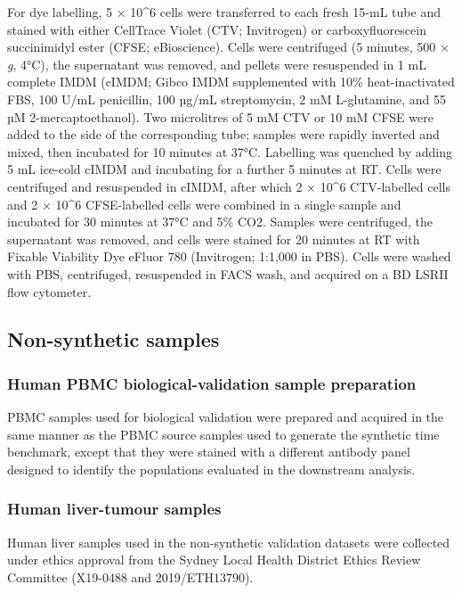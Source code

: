 \documentclass[ASNA]{latex/wiley/USG}
\begin{document}
For dye labelling, 5 × 10\^{}6 cells were transferred to each fresh
15-mL tube and stained with either CellTrace Violet (CTV; Invitrogen) or
carboxyfluorescein succinimidyl ester (CFSE; eBioscience). Cells were
centrifuged (5 minutes, 500 × \emph{g}, 4°C), the supernatant was
removed, and pellets were resuspended in 1 mL complete IMDM (cIMDM;
Gibco IMDM supplemented with 10\% heat-inactivated FBS, 100 U/mL
penicillin, 100 µg/mL streptomycin, 2 mM L-glutamine, and 55 µM
2-mercaptoethanol). Two microlitres of 5 mM CTV or 10 mM CFSE were added
to the side of the corresponding tube; samples were rapidly inverted and
mixed, then incubated for 10 minutes at 37°C. Labelling was quenched by
adding 5 mL ice-cold cIMDM and incubating for a further 5 minutes at RT.
Cells were centrifuged and resuspended in cIMDM, after which 2 × 10\^{}6
CTV-labelled cells and 2 × 10\^{}6 CFSE-labelled cells were combined in
a single sample and incubated for 30 minutes at 37°C and 5\% CO2.
Samples were centrifuged, the supernatant was removed, and cells were
stained for 20 minutes at RT with Fixable Viability Dye eFluor 780
(Invitrogen; 1:1,000 in PBS). Cells were washed with PBS, centrifuged,
resuspended in FACS wash, and acquired on a BD LSRII flow cytometer.

\subsection{Non-synthetic samples}\label{non-synthetic-samples}

\subsubsection{Human PBMC biological-validation sample
preparation}\label{human-pbmc-biological-validation-sample-preparation}

PBMC samples used for biological validation were prepared and acquired
in the same manner as the PBMC source samples used to generate the
synthetic time benchmark, except that they were stained with a different
antibody panel designed to identify the populations evaluated in the
downstream analysis.

\subsubsection{Human liver-tumour
samples}\label{human-liver-tumour-samples}

Human liver samples used in the non-synthetic validation datasets were
collected under ethics approval from the Sydney Local Health District
Ethics Review Committee (X19-0488 and 2019/ETH13790).
\end{document}
